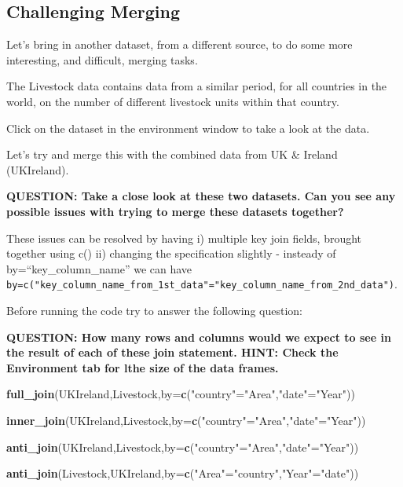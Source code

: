 \documentclass[]{book}
\newenvironment{Shaded}{\begin{snugshade}}{\end{snugshade}}
\newcommand{\DataTypeTok}[1]{\textcolor[rgb]{0.13,0.29,0.53}{#1}}
\newcommand{\KeywordTok}[1]{\textcolor[rgb]{0.13,0.29,0.53}{\textbf{#1}}}
\newcommand{\NormalTok}[1]{#1}
\newcommand{\StringTok}[1]{\textcolor[rgb]{0.31,0.60,0.02}{#1}}
\begin{document}
\hypertarget{challenging-merging}{%
\subsection{Challenging Merging}\label{challenging-merging}}

Let's bring in another dataset, from a different source, to do some more interesting, and difficult, merging tasks.

The Livestock data contains data from a similar period, for all countries in the world, on the number of different livestock units within that country.

Click on the dataset in the environment window to take a look at the data.

Let's try and merge this with the combined data from UK \& Ireland (UKIreland).

\textbf{QUESTION: Take a close look at these two datasets. Can you see any possible issues with trying to merge these datasets together?}

These issues can be resolved by having
i) multiple key join fields, brought together using c()
ii) changing the specification slightly - insteady of by=``key\_column\_name'' we can have \texttt{by=c("key\_column\_name\_from\_1st\_data"="key\_column\_name\_from\_2nd\_data")}.

Before running the code try to answer the following question:

\textbf{QUESTION: How many rows and columns would we expect to see in the result of each of these join statement. HINT: Check the Environment tab for lthe size of the data frames.}

\begin{Shaded}
\begin{Highlighting}[]
\KeywordTok{full_join}\NormalTok{(UKIreland,Livestock,}\DataTypeTok{by=}\KeywordTok{c}\NormalTok{(}\StringTok{"country"}\NormalTok{=}\StringTok{"Area"}\NormalTok{,}\StringTok{"date"}\NormalTok{=}\StringTok{"Year"}\NormalTok{))}

\KeywordTok{inner_join}\NormalTok{(UKIreland,Livestock,}\DataTypeTok{by=}\KeywordTok{c}\NormalTok{(}\StringTok{"country"}\NormalTok{=}\StringTok{"Area"}\NormalTok{,}\StringTok{"date"}\NormalTok{=}\StringTok{"Year"}\NormalTok{))}

\KeywordTok{anti_join}\NormalTok{(UKIreland,Livestock,}\DataTypeTok{by=}\KeywordTok{c}\NormalTok{(}\StringTok{"country"}\NormalTok{=}\StringTok{"Area"}\NormalTok{,}\StringTok{"date"}\NormalTok{=}\StringTok{"Year"}\NormalTok{))}

\KeywordTok{anti_join}\NormalTok{(Livestock,UKIreland,}\DataTypeTok{by=}\KeywordTok{c}\NormalTok{(}\StringTok{"Area"}\NormalTok{=}\StringTok{"country"}\NormalTok{,}\StringTok{"Year"}\NormalTok{=}\StringTok{"date"}\NormalTok{))}
\end{Highlighting}
\end{Shaded}
\end{document}
